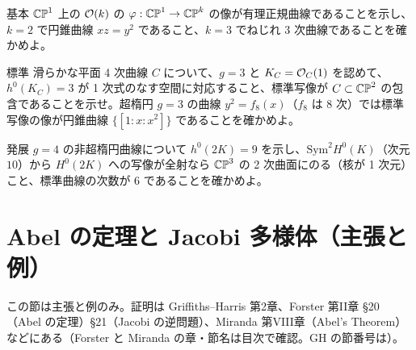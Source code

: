 \begin{prob}{基本}\label{p:ratnormal}
$\mathbb{CP}^1$ 上の $\mathcal O(k)$ の $\varphi:\mathbb{CP}^1\to\mathbb{CP}^k$ の像が有理正規曲線であることを示し、$k=2$ で円錐曲線 $xz=y^2$ であること、$k=3$ でねじれ 3 次曲線であることを確かめよ。
\end{prob}
\begin{prob}{標準}\label{p:planequartic}
滑らかな平面 4 次曲線 $C$ について、$g=3$ と $K_C=\mathcal O_C(1)$ を認めて、$h^0(K_C)=3$ が 1 次式のなす空間に対応すること、標準写像が $C\subset\mathbb{CP}^2$ の包含であることを示せ。超楕円 $g=3$ の曲線 $y^2=f_8(x)$（$f_8$ は 8 次）では標準写像の像が円錐曲線 $\{[1:x:x^2]\}$ であることを確かめよ。
\end{prob}
\begin{prob}{発展}\label{p:g4}
$g=4$ の非超楕円曲線について $h^0(2K)=9$ を示し、$\mathrm{Sym}^2H^0(K)$（次元 $10$）から $H^0(2K)$ への写像が全射なら $\mathbb{CP}^3$ の 2 次曲面にのる（核が 1 次元）こと、標準曲線の次数が $6$ であることを確かめよ。
\end{prob}

\section{Abel の定理と Jacobi 多様体（主張と例）}\label{sec:abel}
この節は主張と例のみ。証明は Griffiths--Harris 第2章、Forster 第II章 §20（Abel の定理）§21（Jacobi の逆問題）、Miranda 第VIII章（Abel's Theorem）などにある（Forster と Miranda の章・節名は目次で確認。GH の節番号は\tQ）。

